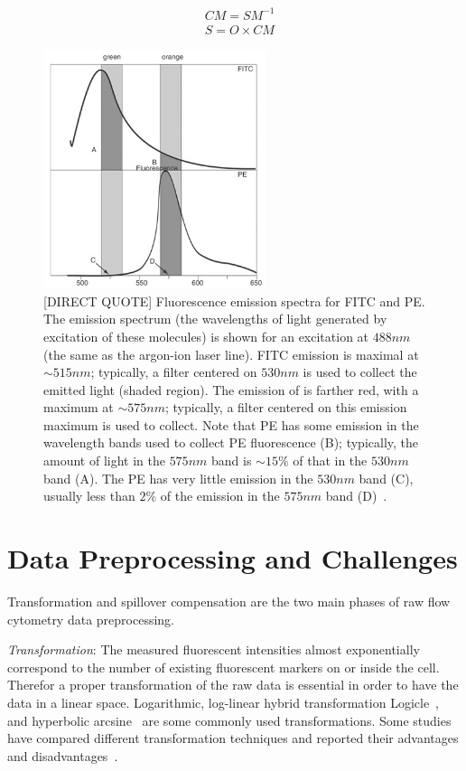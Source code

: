 \begin{align}
  &CM = SM^{-1} \nonumber \\
  &S = O \times CM
  \label{fml:fcs-compensation}
\end{align}

\begin{figure}[!ht]
  \centering
  \includegraphics[height=7cm]{figs/fcs-spillover}
  \caption{[DIRECT QUOTE] Fluorescence emission spectra for FITC and PE. The emission spectrum (the wavelengths of light generated by excitation of these molecules) is shown for an excitation at $488nm$ (the same as the argon-ion laser line). FITC emission is maximal at $\sim 515nm$; typically, a filter centered on $530nm$ is used to collect the emitted light (shaded region). The emission of is farther red, with a maximum at $\sim 575nm$; typically, a filter centered on this emission maximum is used to collect. Note that PE has some emission in the wavelength bands used to collect PE fluorescence (B); typically, the amount of light in the $575nm$ band is $\sim 15\%$ of that in the $530nm$ band (A). The PE has very little emission in the $530nm$ band (C), usually less than $2\%$ of the emission in the $575nm$ band (D)~\cite{flow-cytometry-compensation}.}
  \label{fig:flow-cytometry-spillover}
\end{figure}

\section{Data Preprocessing and Challenges}
Transformation and spillover compensation are the two main phases of raw flow cytometry data preprocessing.

\emph{Transformation}: The measured fluorescent intensities almost exponentially correspond to the number of existing fluorescent markers on or inside the cell. Therefor a proper transformation of the raw data is essential in order to have the data in a linear space. Logarithmic, log-linear hybrid transformation Logicle~\cite{fcs-logicle}, and hyperbolic arcsine~\cite{fcs-arcsineh} are some commonly used transformations. Some studies have compared different transformation techniques and reported their advantages and disadvantages~\cite{fcs-transformation-survey1, fcs-transformation-survey2}.

